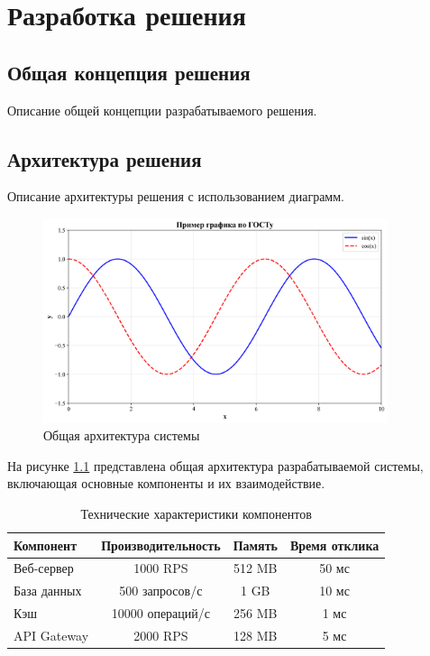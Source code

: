 \chapter{Разработка решения}

\section{Общая концепция решения}

Описание общей концепции разрабатываемого решения.

\section{Архитектура решения}

Описание архитектуры решения с использованием диаграмм.

\begin{figure}[H]
\centering
\includegraphics[width=0.9\textwidth]{images/example_plot.png}
\caption{Общая архитектура системы}
\label{fig:system_architecture}
\end{figure}

На рисунке \ref{fig:system_architecture} представлена общая архитектура разрабатываемой системы, включающая основные компоненты и их взаимодействие.

\begin{table}[H]
\centering
\caption{Технические характеристики компонентов}
\label{tab:component_specs}
\begin{tabular}{|l|c|c|c|}
\hline
\textbf{Компонент} & \textbf{Производительность} & \textbf{Память} & \textbf{Время отклика} \\
\hline
Веб-сервер & 1000 RPS & 512 MB & 50 мс \\
База данных & 500 запросов/с & 1 GB & 10 мс \\
Кэш & 10000 операций/с & 256 MB & 1 мс \\
API Gateway & 2000 RPS & 128 MB & 5 мс \\
\hline
\end{tabular}
\end{table}

